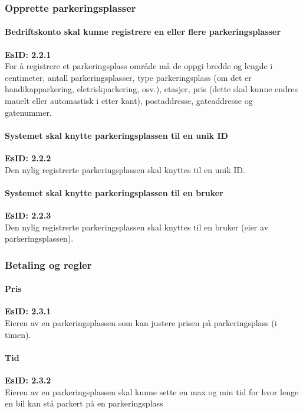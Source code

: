 \documentclass[12pt]{article}
\begin{document}
        \subsubsection{Opprette parkeringsplasser}

            \paragraph{Bedriftskonto skal kunne registrere en eller flere parkeringsplasser}
            \textbf{EsID: 2.2.1}\\For å registrere et parkeringsplass område må de oppgi bredde og lengde i centimeter, antall parkeringsplasser, type parkeringsplass (om det er handikapparkering, eletriskparkering, osv.), etasjer, pris (dette skal kunne endres mauelt eller automastisk i etter kant), postaddresse, gateaddresse og gatenummer.

            \paragraph{Systemet skal knytte parkeringsplassen til en unik ID}
            \textbf{EsID: 2.2.2}\\Den nylig registrerte parkeringsplassen skal knyttes til en unik ID.

            \paragraph{Systemet skal knytte parkeringsplassen til en bruker}
            \textbf{EsID: 2.2.3}\\Den nylig registrerte parkeringsplassen skal knyttes til en bruker (eier av parkeringsplassen).

        \subsubsection{Betaling og regler}

            \paragraph{Pris}
            \textbf{EsID: 2.3.1}\\Eieren av en parkeringsplassen som kan justere prisen på parkeringsplass (i timen).

            \paragraph{Tid}
            \textbf{EsID: 2.3.2}\\Eieren av en parkeringsplassen skal kunne sette en max og min tid for hvor lenge en bil kan stå parkert på en parkeringsplass
\end{document}
